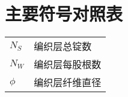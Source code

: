 
\chapter{主要符号对照表}
\label{chap:symb}


\begin{center}
	

\vspace{1cm}
\begin{tabular}{ll}
	$N_S$ \qquad & \hspace{5em}编织层总锭数 \\
	$N_W$ \qquad & \hspace{5em}编织层每股根数\\
	$ \phi $\qquad & \hspace{5em} 编织层纤维直径\\
\end{tabular}


\end{center}
